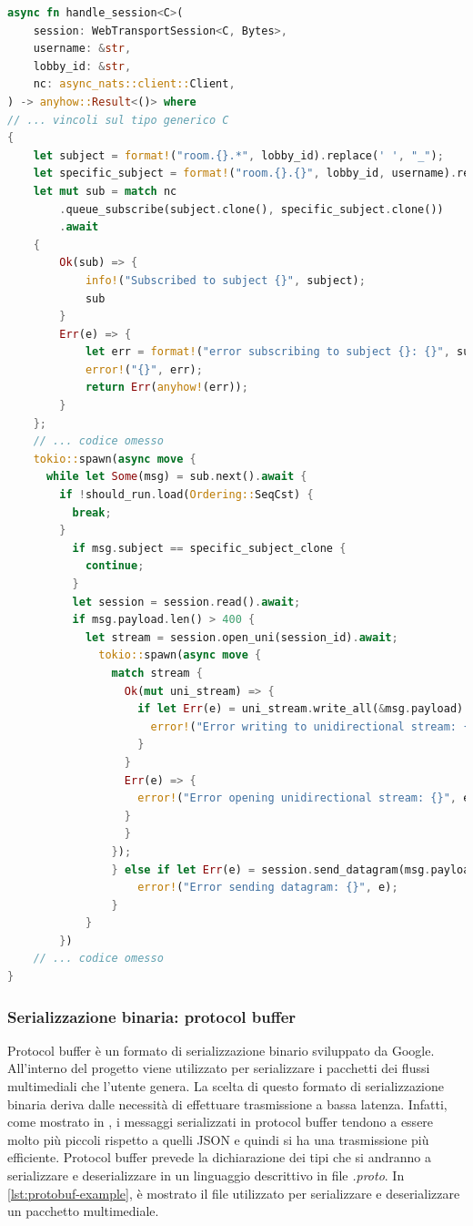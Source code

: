 \documentclass{article}
\begin{document}
\begin{lstlisting}[language=Rust, style=boxed, label={lst:nats-sub}, captionpos=b,caption={Broadcast di pacchetti multimediali in una sessione WebTransport}]
async fn handle_session<C>(
    session: WebTransportSession<C, Bytes>,
    username: &str,
    lobby_id: &str,
    nc: async_nats::client::Client,
) -> anyhow::Result<()> where
// ... vincoli sul tipo generico C
{
    let subject = format!("room.{}.*", lobby_id).replace(' ', "_");
    let specific_subject = format!("room.{}.{}", lobby_id, username).replace(' ', "_");
    let mut sub = match nc
        .queue_subscribe(subject.clone(), specific_subject.clone())
        .await
    {
        Ok(sub) => {
            info!("Subscribed to subject {}", subject);
            sub
        }
        Err(e) => {
            let err = format!("error subscribing to subject {}: {}", subject, e);
            error!("{}", err);
            return Err(anyhow!(err));
        }
    };
    // ... codice omesso
    tokio::spawn(async move {
      while let Some(msg) = sub.next().await {
        if !should_run.load(Ordering::SeqCst) {
          break;
        }
          if msg.subject == specific_subject_clone {
            continue;
          }
          let session = session.read().await;
          if msg.payload.len() > 400 {
            let stream = session.open_uni(session_id).await;
              tokio::spawn(async move {
                match stream {
                  Ok(mut uni_stream) => {
                    if let Err(e) = uni_stream.write_all(&msg.payload).await {
                      error!("Error writing to unidirectional stream: {}", e);
                    }
                  }
                  Err(e) => {
                    error!("Error opening unidirectional stream: {}", e);
                  }
                  }
                });
                } else if let Err(e) = session.send_datagram(msg.payload) {
                    error!("Error sending datagram: {}", e);
                }
            }
        })
    // ... codice omesso
} 
\end{lstlisting}

\subsubsection{Serializzazione binaria: protocol buffer} 
Protocol buffer \cite{ProtcolBuffer} è un formato di serializzazione binario sviluppato da Google. All'interno 
del progetto viene utilizzato per serializzare i pacchetti dei flussi multimediali che 
l'utente genera. La scelta di questo formato di serializzazione binaria deriva dalle necessità 
di effettuare trasmissione a bassa latenza. Infatti, come mostrato in \cite{popic2016performance},
i messaggi serializzati in protocol buffer tendono a essere molto più piccoli rispetto a quelli
JSON e quindi si ha una trasmissione più efficiente. Protocol buffer prevede la dichiarazione dei tipi
che si andranno a serializzare e deserializzare in un linguaggio descrittivo in file \textit{.proto}. 
In \cref{lst:protobuf-example}, è mostrato il file utilizzato per serializzare e 
deserializzare un pacchetto multimediale.
\end{document}
